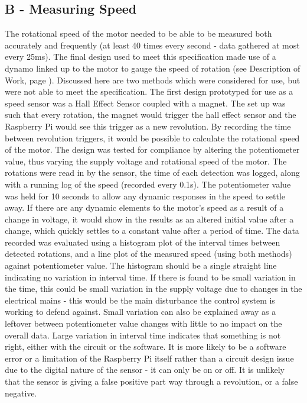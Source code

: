 \documentclass[twoside,a4]{report}
\def\br{\newline \newline \noindent}
\def\rpi{Raspberry Pi }
\begin{document}
\subsection{B - Measuring Speed}
The rotational speed of the motor needed to be able to be measured both accurately and frequently (at least 40 times every second - data gathered at most every 25ms). The final design used to meet this specification made use of a dynamo linked up to the motor to gauge the speed of rotation (see Description of Work, page \pageref{chap:dow}). Discussed here are two methods which were considered for use, but were not able to meet the specification.\br 
The first design prototyped for use as a speed sensor was a Hall Effect Sensor coupled with a magnet. The set up was such that every rotation, the magnet would trigger the hall effect sensor and the \rpi would see this trigger as a new revolution. By recording the time between revolution triggers, it would be possible to calculate the rotational speed of the motor. The design was tested for compliance by altering the potentiometer value, thus varying the supply voltage and rotational speed of the motor. The rotations were read in by the sensor, the time of each detection was logged, along with a running log of the speed (recorded every 0.1s). The potentiometer value was held for 10 seconds to allow any dynamic responses in the speed to settle away. If there are any dynamic elements to the motor's speed as a result of a change in voltage, it would show in the results as an altered initial value after a change, which quickly settles to a constant value after  a period of time. The data recorded was evaluated using a histogram plot of the interval times between detected rotations, and a line plot of the measured speed (using both methods) against potentiometer value. \newline \newline \noindent
The histogram should be a single straight line indicating no variation in interval time. If there is found to be small variation in the time, this could be small variation in the supply voltage due to changes in the electrical mains - this would be the main disturbance the control system is working to defend against. Small variation can also be explained away as a leftover between potentiometer value changes with little to no impact on the overall data. Large variation in interval time indicates that something is not right, either with the circuit or the software. It is more likely to be a software error or a limitation of the Raspberry Pi itself rather than a circuit design issue due to the digital nature of the sensor - it can only be on or off. It is unlikely that the sensor is giving a false positive part way through a revolution, or a false negative. \newline \newline \noindent
\end{document}

